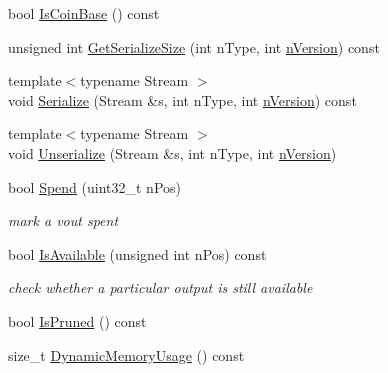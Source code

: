\begin{DoxyCompactItemize}
\item 
bool \mbox{\hyperlink{class_c_coins_a976c1374c3398e1ee23b1110f1663895}{Is\+Coin\+Base}} () const
\item 
unsigned int \mbox{\hyperlink{class_c_coins_a63916fcdb2305c47e6360cf533c27438}{Get\+Serialize\+Size}} (int n\+Type, int \mbox{\hyperlink{class_c_coins_a96fea4ee8841e9ce32f60c2e7e3cf6b6}{n\+Version}}) const
\item 
{\footnotesize template$<$typename Stream $>$ }\\void \mbox{\hyperlink{class_c_coins_a7adea91f27b75755e8cfbc7c46fe3848}{Serialize}} (Stream \&s, int n\+Type, int \mbox{\hyperlink{class_c_coins_a96fea4ee8841e9ce32f60c2e7e3cf6b6}{n\+Version}}) const
\item 
{\footnotesize template$<$typename Stream $>$ }\\void \mbox{\hyperlink{class_c_coins_adaa98cb6d8da3a4d573cd799ddd11051}{Unserialize}} (Stream \&s, int n\+Type, int \mbox{\hyperlink{class_c_coins_a96fea4ee8841e9ce32f60c2e7e3cf6b6}{n\+Version}})
\item 
bool \mbox{\hyperlink{class_c_coins_a0acc5f3849c1c41386d9450a3ee3a3c8}{Spend}} (uint32\+\_\+t n\+Pos)
\begin{DoxyCompactList}\small\item\em mark a vout spent \end{DoxyCompactList}\item 
bool \mbox{\hyperlink{class_c_coins_aa645bc3d18f74e91430ac178a9d28ee4}{Is\+Available}} (unsigned int n\+Pos) const
\begin{DoxyCompactList}\small\item\em check whether a particular output is still available \end{DoxyCompactList}\item 
bool \mbox{\hyperlink{class_c_coins_a597a7cb8830fc29565918ce1823b2244}{Is\+Pruned}} () const
\item 
size\+\_\+t \mbox{\hyperlink{class_c_coins_a8fe3cbe74c622a41d97a19741aa046b5}{Dynamic\+Memory\+Usage}} () const
\end{DoxyCompactItemize}
